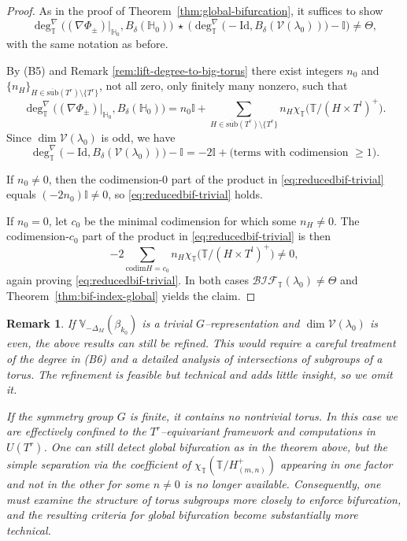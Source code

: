 \documentclass[reqno,twoside,12pt]{amsart}
\newtheorem{Remark}{Remark}[section]
\newcommand{\bH}{\mathbb{H}}
\newcommand{\bI}{\mathbb{I}}
\newcommand{\bT}{\mathbb{T}}
\newcommand{\bV}{\mathbb{V}}
\newcommand{\cV}{\mathcal{V}}
\numberwithin{equation}{section} \errorcontextlines=0
\newcommand{\codim}{\mathrm{ codim  }}
\newcommand{\sub}{\overline{\mathrm{sub}}}
\newcommand{\bif}{\mathcal{BIF}}
\begin{document}
\begin{proof}
 As in the proof of Theorem~\ref{thm:global-bifurcation}, it suffices to show
\begin{equation}\label{eq:reducedbif-trivial}
\deg^{\nabla}_{\bT}\bigl((\nabla\Phi_{\pm})|_{\bH_0},B_{\delta}(\bH_0)\bigr)
\ \star\
\bigl(\deg^{\nabla}_{\bT}\bigl(-\mathrm{Id},B_{\delta}(\cV(\lambda_{0}))\bigr)-\bI\bigr)
\ne \Theta,
\end{equation}
with the same notation as before.

By (B5) and Remark \ref{rem:lift-degree-to-big-torus} there exist integers $n_0$ and $\{n_H\}_{H\in\sub(T^r)\setminus\{T^r\}}$, not all zero, only finitely many nonzero, such that
\[
\deg^{\nabla}_{\bT}\bigl((\nabla\Phi_{\pm})|_{\bH_0},B_{\delta}(\bH_0)\bigr)
=
n_0 \bI+\sum_{H\in\sub(T^r)\setminus\{T^r\}}n_H \chi_{\bT}\bigl(\bT/(H\times T^l)^+\bigr).
\]
Since $\dim\cV(\lambda_0)$ is odd, we have
\[
\deg^{\nabla}_{\bT}\bigl(-\mathrm{Id},B_{\delta}(\cV(\lambda_{0}))\bigr)-\bI
= -2 \bI+\text{(terms with codimension $\ge1$)}.
\]

If $n_0\neq 0$, then the codimension-$0$ part of the product in \eqref{eq:reducedbif-trivial} equals $(-2n_0)\bI\neq 0$, so \eqref{eq:reducedbif-trivial} holds.

If $n_0=0$, let $c_0$ be the minimal codimension for which some $n_H\neq 0$. The codimension-$c_0$ part of the product in \eqref{eq:reducedbif-trivial} is then
\[
-2\sum_{\codim H=c_0} n_H \chi_{\bT}\bigl(\bT/(H\times T^l)^+\bigr)\neq 0,
\]
again proving \eqref{eq:reducedbif-trivial}. In both cases $\bif_{\bT}(\lambda_0)\neq\Theta$ and Theorem~\ref{thm:bif-index-global} yields the claim.
\end{proof}

\begin{Remark}
If $\bV_{-\Delta_M}(\beta_{k_0})$ is a trivial $G$–representation and $\dim \cV(\lambda_0)$ is even, the above results can still be refined. This would require a careful treatment of the degree in \textnormal{(B6)} and a detailed analysis of intersections of subgroups of a torus. The refinement is feasible but technical and adds little insight, so we omit it.

If the symmetry group $G$ is finite, it contains no nontrivial torus. In this case we are effectively confined to the $T^{r}$–equivariant framework and computations in $U(T^{r})$. One can still detect global bifurcation as in the theorem above, but the simple separation via the coefficient of $\chi_{\bT}(\bT/H_{(m,n)}^+)$ appearing in one factor and not in the other for some $n\neq 0$ is no longer available. Consequently, one must examine the structure of torus subgroups more closely to enforce bifurcation, and the resulting criteria for global bifurcation become substantially more technical.
\end{Remark}
\end{document}
